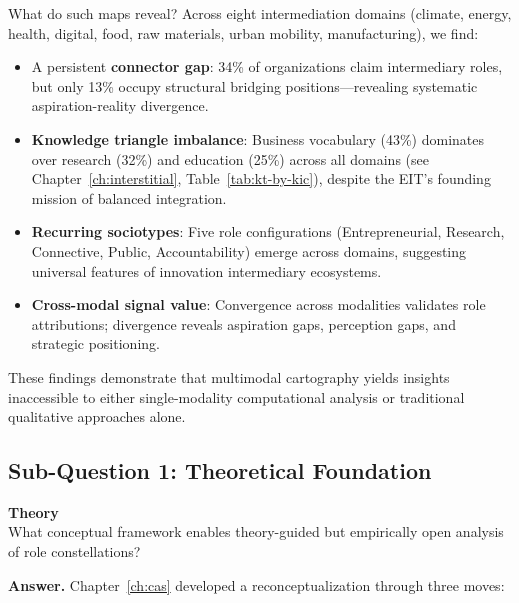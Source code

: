 \documentclass[../main.tex]{subfiles}
\begin{document}
What do such maps reveal? Across eight intermediation domains (climate, energy, health, digital, food, raw materials, urban mobility, manufacturing), we find:

\begin{itemize}[leftmargin=*, itemsep=0.3em]
\item A persistent \textbf{connector gap}: 34\% of organizations claim intermediary roles, but only 13\% occupy structural bridging positions---revealing systematic aspiration-reality divergence.
\item \textbf{Knowledge triangle imbalance}: Business vocabulary (43\%) dominates over research (32\%) and education (25\%) across all domains (see Chapter~\ref{ch:interstitial}, Table~\ref{tab:kt-by-kic}), despite the EIT's founding mission of balanced integration.
\item \textbf{Recurring sociotypes}: Five role configurations (Entrepreneurial, Research, Connective, Public, Accountability) emerge across domains, suggesting universal features of innovation intermediary ecosystems.
\item \textbf{Cross-modal signal value}: Convergence across modalities validates role attributions; divergence reveals aspiration gaps, perception gaps, and strategic positioning.
\end{itemize}

These findings demonstrate that multimodal cartography yields insights inaccessible to either single-modality computational analysis or traditional qualitative approaches alone.

\subsection{Sub-Question 1: Theoretical Foundation}

\begin{subrq}
\textbf{Theory}\\
What conceptual framework enables theory-guided but empirically open analysis of role constellations?
\end{subrq}

\noindent\textbf{Answer.} Chapter~\ref{ch:cas} developed a reconceptualization through three moves:
\end{document}
